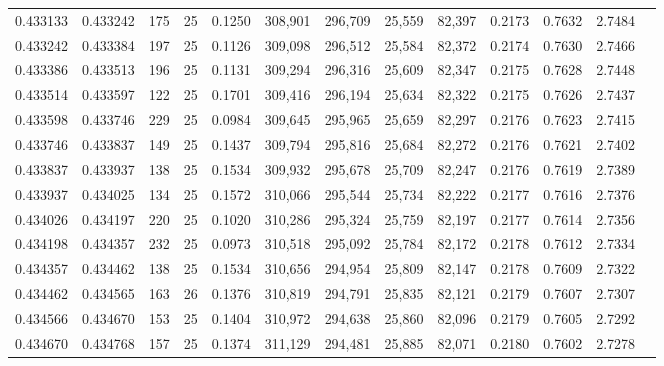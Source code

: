 \begin{tabular}{rrrrrrrrrrrrr}
0.433133 & 0.433242 &   175 &  25 &                                     0.1250 & 308,901 & 296,709 &  25,559 &  82,397 & 0.2173 & 0.7632 & 2.7484 \\
0.433242 & 0.433384 &   197 &  25 &                                     0.1126 & 309,098 & 296,512 &  25,584 &  82,372 & 0.2174 & 0.7630 & 2.7466 \\
0.433386 & 0.433513 &   196 &  25 &                                     0.1131 & 309,294 & 296,316 &  25,609 &  82,347 & 0.2175 & 0.7628 & 2.7448 \\
0.433514 & 0.433597 &   122 &  25 &                                     0.1701 & 309,416 & 296,194 &  25,634 &  82,322 & 0.2175 & 0.7626 & 2.7437 \\
0.433598 & 0.433746 &   229 &  25 &                                     0.0984 & 309,645 & 295,965 &  25,659 &  82,297 & 0.2176 & 0.7623 & 2.7415 \\
0.433746 & 0.433837 &   149 &  25 &                                     0.1437 & 309,794 & 295,816 &  25,684 &  82,272 & 0.2176 & 0.7621 & 2.7402 \\
0.433837 & 0.433937 &   138 &  25 &                                     0.1534 & 309,932 & 295,678 &  25,709 &  82,247 & 0.2176 & 0.7619 & 2.7389 \\
0.433937 & 0.434025 &   134 &  25 &                                     0.1572 & 310,066 & 295,544 &  25,734 &  82,222 & 0.2177 & 0.7616 & 2.7376 \\
0.434026 & 0.434197 &   220 &  25 &                                     0.1020 & 310,286 & 295,324 &  25,759 &  82,197 & 0.2177 & 0.7614 & 2.7356 \\
0.434198 & 0.434357 &   232 &  25 &                                     0.0973 & 310,518 & 295,092 &  25,784 &  82,172 & 0.2178 & 0.7612 & 2.7334 \\
0.434357 & 0.434462 &   138 &  25 &                                     0.1534 & 310,656 & 294,954 &  25,809 &  82,147 & 0.2178 & 0.7609 & 2.7322 \\
0.434462 & 0.434565 &   163 &  26 &                                     0.1376 & 310,819 & 294,791 &  25,835 &  82,121 & 0.2179 & 0.7607 & 2.7307 \\
0.434566 & 0.434670 &   153 &  25 &                                     0.1404 & 310,972 & 294,638 &  25,860 &  82,096 & 0.2179 & 0.7605 & 2.7292 \\
0.434670 & 0.434768 &   157 &  25 &                                     0.1374 & 311,129 & 294,481 &  25,885 &  82,071 & 0.2180 & 0.7602 & 2.7278 \\

\end{tabular}
